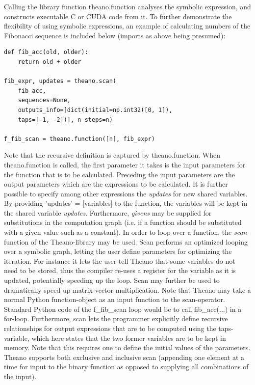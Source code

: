 Calling the library function theano.function analyses the symbolic expression, and constructs executable C or CUDA code from it. To further demonstrate the flexibility of using symbolic expressions, an example of calculating numbers of the Fibonacci sequence is included below (imports as above being presumed):

\begin{verbatim}
def fib_acc(old, older):
    return old + older

fib_expr, updates = theano.scan(
    fib_acc,
    sequences=None,
    outputs_info=[dict(initial=np.int32([0, 1]), 
    taps=[-1, -2])], n_steps=n)

f_fib_scan = theano.function([n], fib_expr)
\end{verbatim}

Note that the recursive definition is captured by theano.function. When theano.function is called, the first parameter it takes is the input parameters for the function that is to be calculated.
Preceding the input parameters are the output parameters which are the expressions to be calculated. It is further possible to specify among other expressions the \textit{updates} for new shared variables. By providing 'updates' = [variables] to the function, the variables will be kept in the shared variable \textit{updates}. Furthermore, \textit{givens} may be supplied for substitutions in the computation graph (i.e. if a function should be substituted with a given value such as a constant).
In order to loop over a function, the \textit{scan}-function of the Theano-library may be used. Scan performs an optimized looping over a symbolic graph, letting the user define parameters for optimizing the iteration. For instance it lets the user tell Theano that some variables do not need to be stored, thus the compiler re-uses a register for the variable as it is updated, potentially speeding up the loop. Scan may further be used to dramatically speed up matrix-vector multiplication.
Note that Theano may take a normal Python function-object as an input function to the scan-operator. Standard Python code of the f\_fib\_scan loop would be to call fib\_acc(...) in a for-loop. Furthermore, scan lets the programmer explicitly define recursive relationships for output expressions that are to be computed using the taps-variable, which here states that the two former variables are to be kept in memory. Note that this requires one to define the initial values of the parameters. Theano supports both exclusive and inclusive scan (appending one element at a time for input to the binary function as opposed to supplying all combinations of the input).

